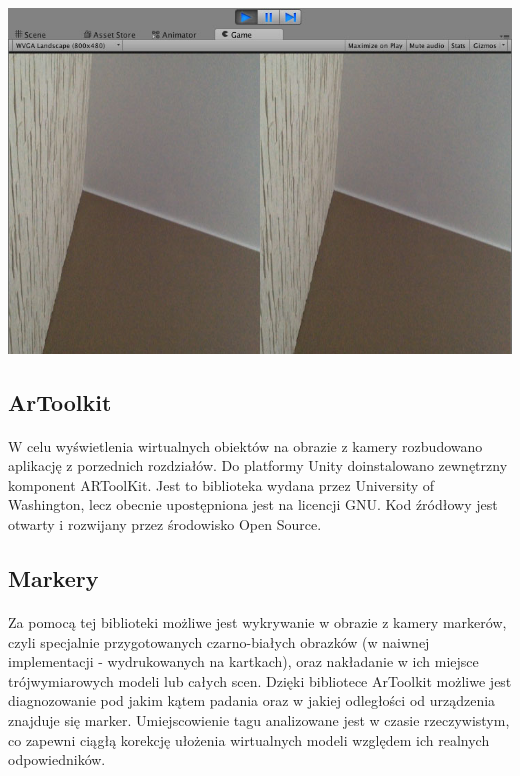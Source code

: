 \begin{center}
\includegraphics[width=1\textwidth]{images/kadr.jpg}
\end{center}

\subsection{ArToolkit}
\paragraph{}
W celu wyświetlenia wirtualnych obiektów na obrazie z kamery rozbudowano aplikację z porzednich rozdziałów. Do platformy Unity doinstalowano zewnętrzny komponent ARToolKit\cite{ar}. Jest to biblioteka wydana przez University of Washington\cite{ar2}, lecz obecnie upostępniona jest na licencji GNU. Kod źródłowy jest otwarty i rozwijany przez środowisko Open Source\cite{ar3}.
\subsection{Markery}
\paragraph{}
Za pomocą tej biblioteki możliwe jest wykrywanie w obrazie z kamery markerów, czyli specjalnie przygotowanych czarno-białych obrazków (w naiwnej implementacji - wydrukowanych na kartkach), oraz nakładanie w ich miejsce trójwymiarowych modeli lub całych scen. Dzięki bibliotece ArToolkit możliwe jest diagnozowanie pod jakim kątem padania oraz w jakiej odległości od urządzenia znajduje się marker. Umiejscowienie tagu analizowane jest w czasie rzeczywistym, co zapewni ciągłą korekcję ułożenia wirtualnych modeli względem ich realnych odpowiedników.

